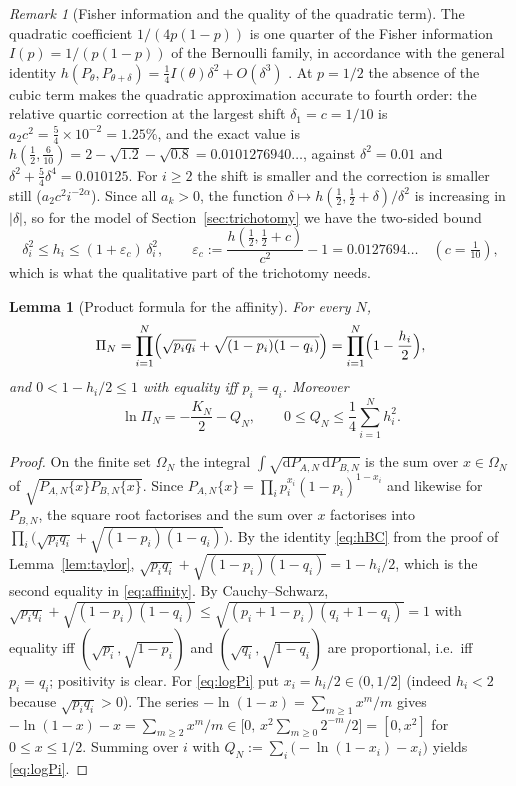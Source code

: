 \documentclass[11pt,reqno]{amsart}
\theoremstyle{plain}
\newtheorem{lemma}[theorem]{Lemma}
\theoremstyle{definition}
\theoremstyle{remark}
\newtheorem{remark}[theorem]{Remark}
\numberwithin{equation}{section}
\newcommand{\dd}{\mathrm{d}}
\newcommand{\PAN}{P_{A,N}}
\newcommand{\PBN}{P_{B,N}}
\begin{document}
\begin{remark}[Fisher information and the quality of the quadratic term]\label{rem:fisher}
The quadratic coefficient $1/(4p(1-p))$ is one quarter of the Fisher information $I(p)=1/(p(1-p))$ of the Bernoulli family, in accordance with the general identity $h(P_\theta,P_{\theta+\delta})=\frac14 I(\theta)\delta^2+O(\delta^3)$ \cite{LeCam1986}. At $p=1/2$ the absence of the cubic term makes the quadratic approximation accurate to fourth order: the relative quartic correction at the largest shift $\delta_1=c=1/10$ is $a_2c^2=\frac54\times10^{-2}=1.25\%$, and the exact value is $h(\frac12,\frac6{10})=2-\sqrt{1.2}-\sqrt{0.8}=0.0101276940\ldots$, against $\delta^2=0.01$ and $\delta^2+\frac54\delta^4=0.010125$. For $i\ge2$ the shift is smaller and the correction is smaller still ($a_2c^2i^{-2\alpha}$). Since all $a_k>0$, the function $\delta\mapsto h(\frac12,\frac12+\delta)/\delta^2$ is increasing in $|\delta|$, so for the model of Section~\ref{sec:trichotomy} we have the two-sided bound
\begin{equation}\label{eq:sandwich}
\delta_i^2\le h_i\le(1+\varepsilon_c)\,\delta_i^2,\qquad \varepsilon_c:=\frac{h(\frac12,\frac12+c)}{c^2}-1=0.0127694\ldots\quad(c=\tfrac1{10}),
\end{equation}
which is what the qualitative part of the trichotomy needs.
\end{remark}

\begin{lemma}[Product formula for the affinity]\label{lem:affinity}
For every $N$,
\begin{equation}\label{eq:affinity}
\Pi_N=\prod_{i=1}^N\Bigl(\sqrt{p_iq_i}+\sqrt{(1-p_i)(1-q_i)}\Bigr)=\prod_{i=1}^N\Bigl(1-\frac{h_i}{2}\Bigr),
\end{equation}
and $0<1-h_i/2\le1$ with equality iff $p_i=q_i$. Moreover
\begin{equation}\label{eq:logPi}
\ln\Pi_N=-\frac{K_N}{2}-Q_N,\qquad 0\le Q_N\le\frac14\sum_{i=1}^N h_i^2 .
\end{equation}
\end{lemma}

\begin{proof}
On the finite set $\Omega_N$ the integral $\int\sqrt{\dd\PAN\,\dd\PBN}$ is the sum over $x\in\Omega_N$ of $\sqrt{\PAN\{x\}\PBN\{x\}}$. Since $\PAN\{x\}=\prod_i p_i^{x_i}(1-p_i)^{1-x_i}$ and likewise for $\PBN$, the square root factorises and the sum over $x$ factorises into $\prod_i\bigl(\sqrt{p_iq_i}+\sqrt{(1-p_i)(1-q_i)}\bigr)$. By the identity \eqref{eq:hBC} from the proof of Lemma~\ref{lem:taylor}, $\sqrt{p_iq_i}+\sqrt{(1-p_i)(1-q_i)}=1-h_i/2$, which is the second equality in \eqref{eq:affinity}. By Cauchy--Schwarz, $\sqrt{p_iq_i}+\sqrt{(1-p_i)(1-q_i)}\le\sqrt{(p_i+1-p_i)(q_i+1-q_i)}=1$ with equality iff $(\sqrt{p_i},\sqrt{1-p_i})$ and $(\sqrt{q_i},\sqrt{1-q_i})$ are proportional, i.e.\ iff $p_i=q_i$; positivity is clear. For \eqref{eq:logPi} put $x_i=h_i/2\in(0,1/2]$ (indeed $h_i<2$ because $\sqrt{p_iq_i}>0$). The series $-\ln(1-x)=\sum_{m\ge1}x^m/m$ gives $-\ln(1-x)-x=\sum_{m\ge2}x^m/m\in\bigl[0,\,x^2\sum_{m\ge0}2^{-m}/2\bigr]=[0,x^2]$ for $0\le x\le1/2$. Summing over $i$ with $Q_N:=\sum_i\bigl(-\ln(1-x_i)-x_i\bigr)$ yields \eqref{eq:logPi}.
\end{proof}
\end{document}
